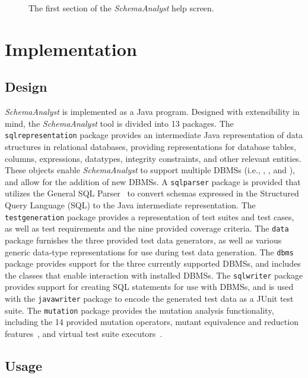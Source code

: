 \begin{figure}

\caption{\label{fig:usage} The first section of the \textit{SchemaAnalyst} help screen.}
\end{figure}

\section{Implementation}\label{sec:implementation}
\subsection{Design}


\textit{SchemaAnalyst} is implemented as a Java program.  Designed with extensibility in mind, the
\textit{SchemaAnalyst} tool is divided into 13 packages. The \texttt{sqlrepresentation} package provides an intermediate
Java representation of data structures in relational databases, providing representations for database tables, columns,
expressions, datatypes, integrity constraints, and other relevant entities. These objects enable \textit{SchemaAnalyst}
to support multiple DBMSs (i.e., \sqlite, \postgres, and \hypersql), and allow for the addition of new DBMSs. A
\texttt{sqlparser} package is provided that utilizes the General SQL Parser~\cite{} to convert schemas expressed in the
Structured Query Language (SQL) to the Java intermediate representation. The \texttt{testgeneration} package provides a
representation of test suites and test cases, as well as test requirements and the nine provided coverage criteria. The
\texttt{data} package furnishes the three provided test data generators, as well as various generic data-type
representations for use during test data generation. The \texttt{dbms} package provides support for the three currently
supported DBMSs, and includes the classes that enable interaction with installed DBMSs. The \texttt{sqlwriter} package
provides support for creating SQL statements for use with DBMSs, and is used with the \texttt{javawriter} package to
encode the generated test data as a JUnit test suite. The \texttt{mutation} package provides the mutation analysis
functionality, including the 14 provided mutation operators, mutant equivalence and reduction
features~\cite{wright2014impact}, and virtual test suite executors~\cite{mcminn2016virtual}.


\subsection{Usage}

